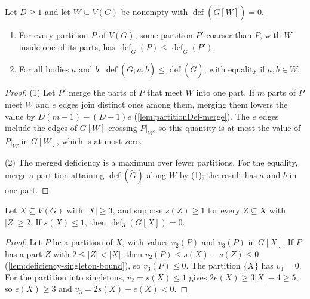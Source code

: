 \begin{lemma}
  \label{lem:deficiency-merge-rigid}
  \leanok
  Let $D \ge 1$ and let $W \subseteq V(G)$ be nonempty with
  $\operatorname{def}(\tilde G[W]) = 0$.
  \begin{enumerate}
    \item For every partition $P$ of $V(G)$, some partition $P'$ coarser
      than $P$, with $W$ inside one of its parts, has
      $\operatorname{def}_{\tilde G}(P) \le \operatorname{def}_{\tilde
      G}(P')$.
    \item For all bodies $a$ and $b$, $\operatorname{def}(\tilde G; a, b)
      \le \operatorname{def}(\tilde G)$, with equality if $a, b \in W$.
  \end{enumerate}
\end{lemma}
\begin{proof}
  \leanok
  (1) Let $P'$ merge the parts of $P$ that meet $W$ into one part. If $m$
  parts of $P$ meet $W$ and $e$ edges join distinct ones among them,
  merging them lowers the value by $D(m - 1) - (D - 1)e$
  (\cref{lem:partitionDef-merge}). The $e$ edges include the edges of
  $G[W]$ crossing $P|_W$, so this quantity is at most the value of
  $P|_W$ in $G[W]$, which is at most zero.

  (2) The merged deficiency is a maximum over fewer partitions. For the
  equality, merge a partition attaining $\operatorname{def}(\tilde G)$
  along $W$ by (1); the result has $a$ and $b$ in one part.
\end{proof}

\begin{lemma}
  \label{lem:deficiency-tight-rigid}
  \leanok
  Let $X \subseteq V(G)$ with $|X| \ge 3$, and suppose $s(Z) \ge 1$ for
  every $Z \subseteq X$ with $|Z| \ge 2$. If $s(X) \le 1$, then
  $\operatorname{def}_3(G[X]) = 0$.
\end{lemma}
\begin{proof}
  \leanok
  Let $P$ be a partition of $X$, with values $v_2(P)$ and $v_3(P)$ in
  $G[X]$. If $P$ has a part $Z$ with $2 \le |Z| < |X|$, then
  $v_2(P) \le s(X) - s(Z) \le 0$
  (\cref{lem:deficiency-singleton-bound}), so $v_3(P) \le 0$. The
  partition $\{X\}$ has $v_3 = 0$. For the partition into singletons,
  $v_2 = s(X) \le 1$ gives $2e(X) \ge 3|X| - 4 \ge 5$, so $e(X) \ge 3$
  and $v_3 = 2s(X) - e(X) < 0$.
\end{proof}


